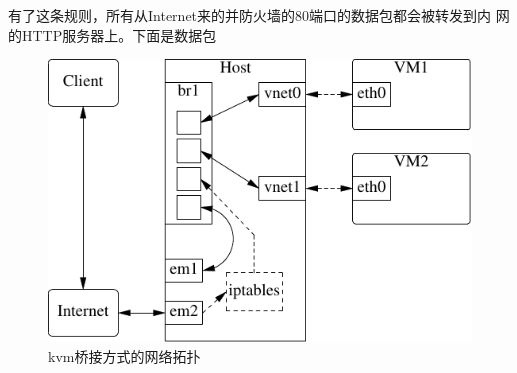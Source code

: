有了这条规则，所有从Internet来的并防火墙的80端口的数据包都会被转发到内
网的HTTP服务器上。下面是数据包

\begin{figure}[hbtp]
  \centering
  \caption{kvm桥接方式的网络拓扑}
  \label{fig:kvm_bridge_network}
  \includegraphics{graph/kvm_network.pdf}
\end{figure}
